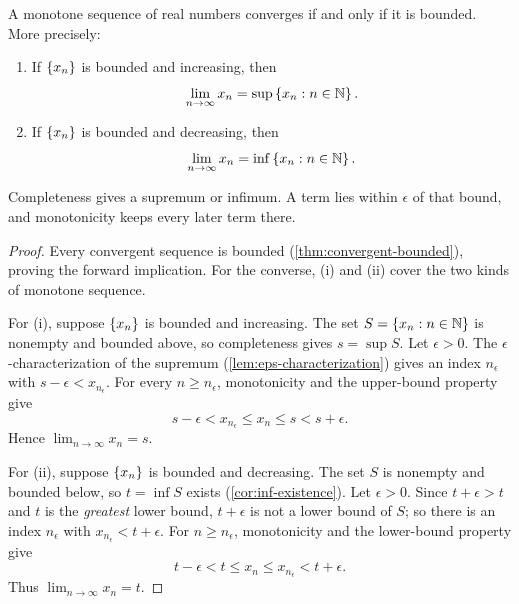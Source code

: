 \begin{theorem}\label{thm:monotone-convergence}
    A monotone sequence of real numbers converges if and only if it is bounded. More precisely:
    \begin{enumerate}
        \item[(i)] If $\left\{x_n\right\}$ is bounded and increasing, then
            \[
                \lim_{n\to\infty}x_n=\sup\left\{x_n:n\in\mathbb{N}\right\}.
            \]
        \item[(ii)] If $\left\{x_n\right\}$ is bounded and decreasing, then
            \[
                \lim_{n\to\infty}x_n=\inf\left\{x_n:n\in\mathbb{N}\right\}.
            \]
    \end{enumerate}
\end{theorem}
\begin{idea}
    Completeness gives a supremum or infimum. A term lies within $\epsilon$ of that bound, and monotonicity keeps every later term there.
\end{idea}
\begin{proof}
    Every convergent sequence is bounded (\cref{thm:convergent-bounded}), proving the forward implication. For the converse, (i) and (ii) cover the two kinds of monotone sequence.

    For (i), suppose $\left\{x_n\right\}$ is bounded and increasing. The set $S=\left\{x_n:n\in\mathbb{N}\right\}$ is nonempty and bounded above, so completeness gives $s=\sup S$. Let $\epsilon>0$. The $\epsilon$-characterization of the supremum (\cref{lem:eps-characterization}) gives an index $n_\epsilon$ with $s-\epsilon<x_{n_\epsilon}$. For every $n\geq n_\epsilon$, monotonicity and the upper-bound property give
    \[
        s-\epsilon<x_{n_\epsilon}\leq x_n\leq s<s+\epsilon.
    \]
    Hence $\lim_{n\to\infty}x_n=s$.

    For (ii), suppose $\left\{x_n\right\}$ is bounded and decreasing. The set $S$ is nonempty and bounded below, so $t=\inf S$ exists (\cref{cor:inf-existence}). Let $\epsilon>0$. Since $t+\epsilon>t$ and $t$ is the \emph{greatest} lower bound, $t+\epsilon$ is not a lower bound of $S$; so there is an index $n_\epsilon$ with $x_{n_\epsilon}<t+\epsilon$. For $n\geq n_\epsilon$, monotonicity and the lower-bound property give
    \[
        t-\epsilon<t\leq x_n\leq x_{n_\epsilon}<t+\epsilon.
    \]
    Thus $\lim_{n\to\infty}x_n=t$.
\end{proof}

